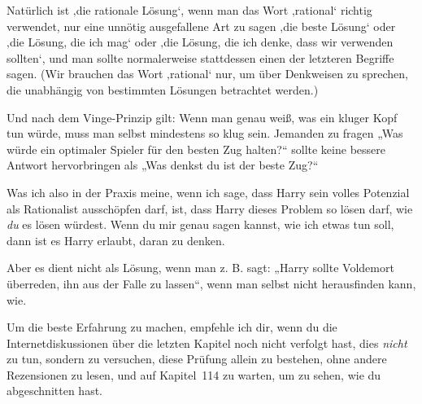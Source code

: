 {%
Natürlich ist ‚die rationale Lösung‘, wenn man das Wort ‚rational‘ richtig verwendet, nur eine unnötig ausgefallene Art zu sagen ‚die beste Lösung‘ oder ‚die Lösung, die ich mag‘ oder ‚die Lösung, die ich denke, dass wir verwenden sollten‘, und man sollte normalerweise stattdessen einen der letzteren Begriffe sagen. (Wir brauchen das Wort ‚rational‘ nur, um über Denkweisen zu sprechen, die unabhängig von bestimmten Lösungen betrachtet werden.)


Und nach dem Vinge-Prinzip gilt: Wenn man genau weiß, was ein kluger Kopf tun würde, muss man selbst mindestens so klug sein. Jemanden zu fragen
„Was würde ein optimaler Spieler für den besten Zug halten?“ sollte keine bessere Antwort hervorbringen als
„Was denkst du ist der beste Zug?“

Was ich also in der Praxis meine, wenn ich sage, dass Harry sein volles Potenzial als Rationalist ausschöpfen darf, ist, dass Harry dieses Problem so lösen darf, wie \emph{du} es lösen würdest. Wenn du mir genau sagen kannst, wie ich etwas tun soll, dann ist es Harry erlaubt, daran zu denken.

Aber es dient nicht als Lösung, wenn man z. B. sagt:
„Harry sollte Voldemort überreden, ihn aus der Falle zu lassen“, wenn man selbst nicht herausfinden kann, wie.

Um die beste Erfahrung zu machen, empfehle ich dir, wenn du die Internetdiskussionen über die letzten Kapitel noch nicht verfolgt hast, dies \emph{nicht} zu tun, sondern zu versuchen, diese Prüfung allein zu bestehen, ohne andere Rezensionen zu lesen, und auf Kapitel~114 zu warten, um zu sehen, wie du abgeschnitten hast.

}
